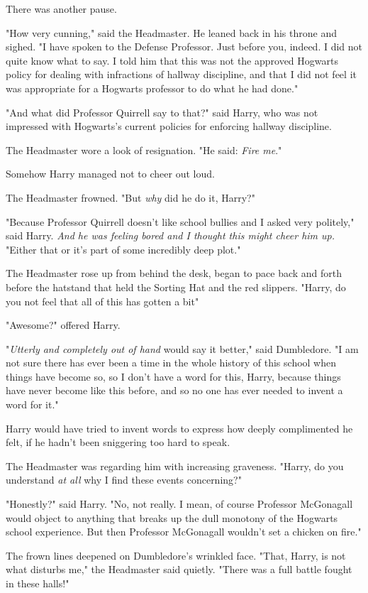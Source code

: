 There was another pause.

"How very cunning," said the Headmaster. He leaned back in his throne and
sighed. "I have spoken to the Defense Professor. Just before you, indeed. I did
not quite know what to say. I told him that this was not the approved Hogwarts
policy for dealing with infractions of hallway discipline, and that I did not
feel it was appropriate for a Hogwarts professor to do what he had done."

"And what did Professor Quirrell say to that?" said Harry, who was not
impressed with Hogwarts's current policies for enforcing hallway discipline.

The Headmaster wore a look of resignation. "He said: \emph{Fire me}."

Somehow Harry managed not to cheer out loud.

The Headmaster frowned. "But \emph{why} did he do it, Harry?"

"Because Professor Quirrell doesn't like school bullies and I asked very
politely," said Harry. \emph{And he was feeling bored and I thought this might
cheer him up.} "Either that or it's part of some incredibly deep plot."

The Headmaster rose up from behind the desk, began to pace back and forth
before the hatstand that held the Sorting Hat and the red slippers. "Harry, do
you not feel that all of this has gotten a bit{\el}"

"Awesome?" offered Harry.

"\emph{Utterly and completely out of hand} would say it better," said
Dumbledore. "I am not sure there has ever been a time in the whole history of
this school when things have become so, so{\el} I don't have a word for
this, Harry, because things have never become like this before, and so no one
has ever needed to invent a word for it."

Harry would have tried to invent words to express how deeply complimented he
felt, if he hadn't been sniggering too hard to speak.

The Headmaster was regarding him with increasing graveness. "Harry, do you
understand \emph{at all} why I find these events concerning?"

"Honestly?" said Harry. "No, not really. I mean, of course Professor McGonagall
would object to anything that breaks up the dull monotony of the Hogwarts
school experience. But then Professor McGonagall wouldn't set a chicken on
fire."

The frown lines deepened on Dumbledore's wrinkled face. "That, Harry, is not
what disturbs me," the Headmaster said quietly. "There was a full battle fought
in these halls!"


